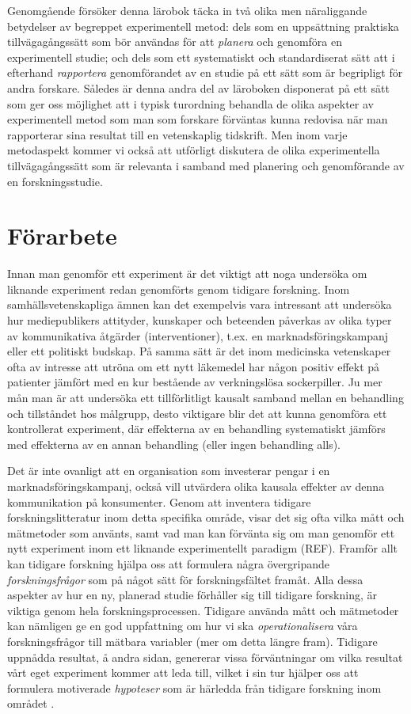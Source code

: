 \documentclass[
]{book}
\begin{document}
Genomgående försöker denna lärobok täcka in två olika men näraliggande betydelser av begreppet experimentell metod: dels som en uppsättning praktiska tillvägagångssätt som bör användas för att \emph{planera} och genomföra en experimentell studie; och dels som ett systematiskt och standardiserat sätt att i efterhand \emph{rapportera} genomförandet av en studie på ett sätt som är begripligt för andra forskare. Således är denna andra del av läroboken disponerat på ett sätt som ger oss möjlighet att i typisk turordning behandla de olika aspekter av experimentell metod som man som forskare förväntas kunna redovisa när man rapporterar sina resultat till en vetenskaplig tidskrift. Men inom varje metodaspekt kommer vi också att utförligt diskutera de olika experimentella tillvägagångssätt som är relevanta i samband med planering och genomförande av en forskningsstudie.

\hypertarget{chap06}{%
\chapter{Förarbete}\label{chap06}}

Innan man genomför ett experiment är det viktigt att noga undersöka om liknande experiment redan genomförts genom tidigare forskning. Inom samhällsvetenskapliga ämnen kan det exempelvis vara intressant att undersöka hur mediepublikers attityder, kunskaper och beteenden påverkas av olika typer av kommunikativa åtgärder (interventioner), t.ex. en marknadsföringskampanj eller ett politiskt budskap. På samma sätt är det inom medicinska vetenskaper ofta av intresse att utröna om ett nytt läkemedel har någon positiv effekt på patienter jämfört med en kur bestående av verkningslösa sockerpiller. Ju mer mån man är att undersöka ett tillförlitligt kausalt samband mellan en behandling och tillståndet hos målgrupp, desto viktigare blir det att kunna genomföra ett kontrollerat experiment, där effekterna av en behandling systematiskt jämförs med effekterna av en annan behandling (eller ingen behandling alls).

Det är inte ovanligt att en organisation som investerar pengar i en marknadsföringskampanj, också vill utvärdera olika kausala effekter av denna kommunikation på konsumenter. Genom att inventera tidigare forskningslitteratur inom detta specifika område, visar det sig ofta vilka mått och mätmetoder som använts, samt vad man kan förvänta sig om man genomför ett nytt experiment inom ett liknande experimentellt paradigm (REF). Framför allt kan tidigare forskning hjälpa oss att formulera några övergripande \emph{forskningsfrågor} som på något sätt för forskningsfältet framåt. Alla dessa aspekter av hur en ny, planerad studie förhåller sig till tidigare forskning, är viktiga genom hela forskningsprocessen. Tidigare använda mått och mätmetoder kan nämligen ge en god uppfattning om hur vi ska \emph{operationalisera} våra forskningsfrågor till mätbara variabler (mer om detta längre fram). Tidigare uppnådda resultat, å andra sidan, genererar vissa förväntningar om vilka resultat vårt eget experiment kommer att leda till, vilket i sin tur hjälper oss att formulera motiverade \emph{hypoteser} som är härledda från tidigare forskning inom området \citep{holmberg-2016-effects}.
\end{document}

